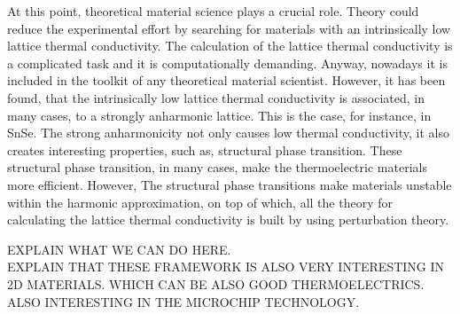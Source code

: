At this point, theoretical material science plays a crucial role. Theory could reduce the experimental effort by 
searching for materials with an intrinsically low lattice thermal conductivity. The calculation of the lattice 
thermal conductivity is a complicated task and it is computationally demanding. Anyway, nowadays it is included in 
the toolkit of any theoretical material scientist. However, it has been found, that the intrinsically low lattice 
thermal conductivity is associated, in many cases, to a strongly anharmonic lattice. This is the case, for instance, 
in SnSe. The strong anharmonicity not only causes low thermal conductivity, it also creates interesting properties,
such as, structural  phase transition. These structural phase transition, in many cases, make the thermoelectric 
materials more efficient. However, The structural phase transitions make materials unstable within the harmonic 
approximation, on top of which, all the theory for calculating the lattice thermal conductivity is built by using 
perturbation theory.

EXPLAIN WHAT WE CAN DO HERE. \\

EXPLAIN THAT THESE FRAMEWORK IS ALSO VERY INTERESTING IN 2D MATERIALS. WHICH CAN BE ALSO GOOD THERMOELECTRICS. ALSO 
INTERESTING IN THE MICROCHIP TECHNOLOGY.
